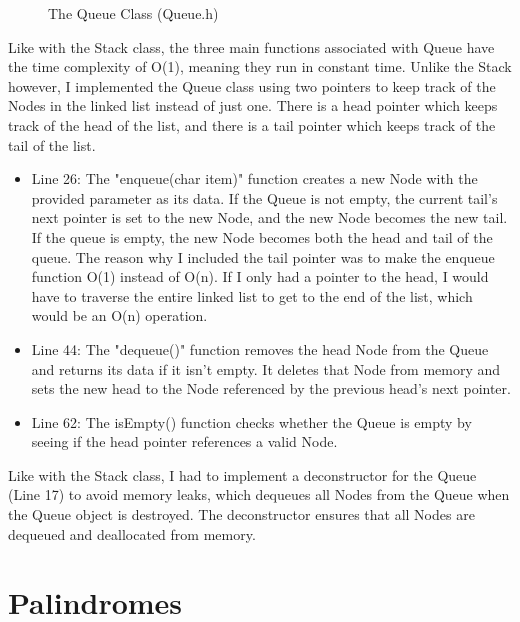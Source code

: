 \documentclass[letterpaper, 10pt]{article}
\begin{document}
\begin{figure}[H]
  \centering
   
  \label{fig:figure2.3_part2}
\end{figure}

\begin{figure}[H]
  \centering
   
  \caption{The Queue Class (Queue.h)}
  \label{fig:figure2.3_part3}
\end{figure}
\noindent
Like with the Stack class, the three main functions associated with Queue have the time complexity of O(1), meaning they run in constant time. Unlike the Stack however, I implemented the Queue class using two pointers to keep track of the Nodes in the linked list instead of just one. There is a head pointer which keeps track of the head of the list, and there is a tail pointer which keeps track of the tail of the list.
\noindent
\begin{itemize}
  \item Line 26: The "enqueue(char item)" function creates a new Node with the provided parameter as its data. If the Queue is not empty, the current tail's next pointer is set to the new Node, and the new Node becomes the new tail. If the queue is empty, the new Node becomes both the head and tail of the queue.
  \newline
  The reason why I included the tail pointer was to make the enqueue function O(1) instead of O(n). If I only had a pointer to the head, I would have to traverse the entire linked list to get to the end of the list, which would be an O(n) operation. 
  \item Line 44: The "dequeue()" function removes the head Node from the Queue and returns its data if it isn't empty. It deletes that Node from memory and sets the new head to the Node referenced by the previous head's next pointer.
  \item Line 62: The isEmpty() function checks whether the Queue is empty by seeing if the head pointer references a valid Node.
\end{itemize} 
\noindent
Like with the Stack class, I had to implement a deconstructor for the Queue (Line 17) to avoid memory leaks, which dequeues all Nodes from the Queue when the Queue object is destroyed. The deconstructor ensures that all Nodes are dequeued and deallocated from memory.  

\section{Palindromes}
\setcounter{figure}{0} %
\end{document}

